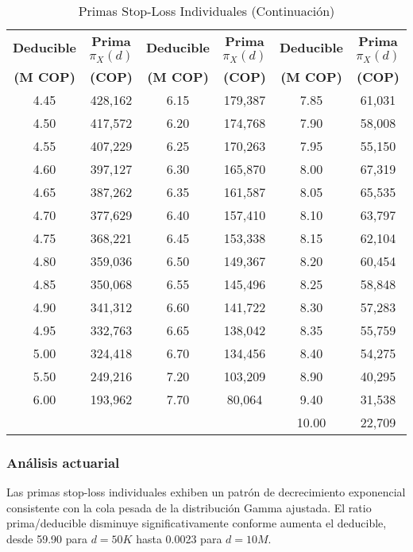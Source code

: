 \begin{table}[H]
\centering
\caption{Primas Stop-Loss Individuales (Continuación)}
\scriptsize
\begin{tabular}{|c|c|c|c|c|c|}
\hline
\textbf{Deducible} & \textbf{Prima $\pi_X(d)$} & \textbf{Deducible} & \textbf{Prima $\pi_X(d)$} & \textbf{Deducible} & \textbf{Prima $\pi_X(d)$} \\
\textbf{(M COP)} & \textbf{(COP)} & \textbf{(M COP)} & \textbf{(COP)} & \textbf{(M COP)} & \textbf{(COP)} \\
\hline
4.45 & 428,162 & 6.15 & 179,387 & 7.85 & 61,031 \\
4.50 & 417,572 & 6.20 & 174,768 & 7.90 & 58,008 \\
4.55 & 407,229 & 6.25 & 170,263 & 7.95 & 55,150 \\
4.60 & 397,127 & 6.30 & 165,870 & 8.00 & 67,319 \\
4.65 & 387,262 & 6.35 & 161,587 & 8.05 & 65,535 \\
4.70 & 377,629 & 6.40 & 157,410 & 8.10 & 63,797 \\
4.75 & 368,221 & 6.45 & 153,338 & 8.15 & 62,104 \\
4.80 & 359,036 & 6.50 & 149,367 & 8.20 & 60,454 \\
4.85 & 350,068 & 6.55 & 145,496 & 8.25 & 58,848 \\
4.90 & 341,312 & 6.60 & 141,722 & 8.30 & 57,283 \\
4.95 & 332,763 & 6.65 & 138,042 & 8.35 & 55,759 \\
5.00 & 324,418 & 6.70 & 134,456 & 8.40 & 54,275 \\
5.50 & 249,216 & 7.20 & 103,209 & 8.90 & 40,295 \\
6.00 & 193,962 & 7.70 & 80,064 & 9.40 & 31,538 \\
\multicolumn{2}{|c|}{} & \multicolumn{2}{|c|}{} & 10.00 & 22,709 \\
\hline
\end{tabular}
\end{table}

\subsubsection{Análisis actuarial}

Las primas stop-loss individuales exhiben un patrón de decrecimiento exponencial consistente con la cola pesada de la distribución Gamma ajustada. El ratio prima/deducible disminuye significativamente conforme aumenta el deducible, desde 59.90 para $d = 50K$ hasta 0.0023 para $d = 10M$.

